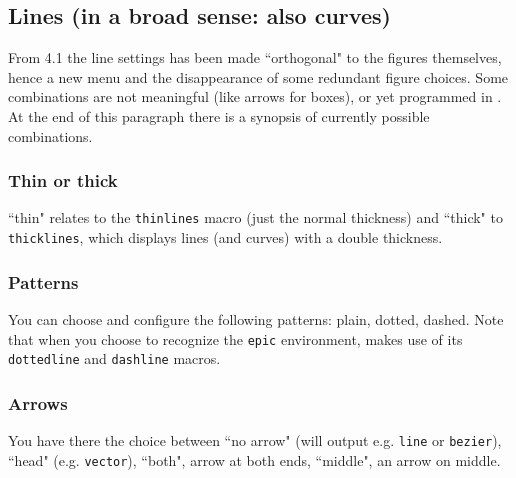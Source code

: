 \documentclass[11pt,a4paper]{article}
\begin{document}
\subsection{Lines (in a broad sense: also curves)}
From {\TC} 4.1 the line settings has been made ``orthogonal" to the figures
themselves, hence a new menu and the disappearance of some redundant
figure choices. Some combinations are not meaningful
(like arrows for boxes), or yet programmed in {\TC}.
At the end of this paragraph there is a synopsis of currently possible combinations.
%
\subsubsection{Thin or thick}
``thin" relates to the {\tt \bs thinlines} macro (just the normal thickness)
and ``thick" to {\tt \bs thicklines}, which displays lines (and curves)
with a double thickness.
%
\subsubsection{Patterns}
You can choose and configure the following patterns:
plain, dotted, dashed. Note that when you choose to recognize
the {\tt epic} environment, {\TC} makes use of its
{\tt \bs dottedline} and {\tt \bs dashline} macros.
%
\subsubsection{Arrows}
%
You have there the choice between ``no arrow" (will output e.g. {\tt \bs line}
or {\tt \bs bezier}), ``head" (e.g. {\tt \bs vector}), ``both", arrow at both ends,
``middle", an arrow on middle.
%
\end{document}
